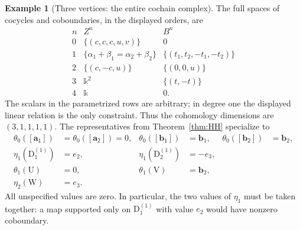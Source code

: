 \documentclass[a4paper,11pt,oneside,reqno]{amsart}
\theoremstyle{definition}
\newtheorem{example}[theorem]{Example}
\numberwithin{equation}{section}
\begin{document}
\begin{example}[Three vertices: the entire cochain complex]
		The full spaces of cocycles and coboundaries, in the displayed orders,
		are
		\begin{equation}\label{eq:m3-ZB}
			\begin{array}{c|c|c}
				n&Z^n&B^n\\\hline
				0&\{(c,c,c,u,v)\}&0\\
				1&\{\alpha_1+\beta_1=\alpha_2+\beta_2\}
				&\{(t_1,t_2,-t_1,-t_2)\}\\
				2&\{(c,-c,u)\}&\{(0,0,u)\}\\
				3&\Bbbk^2&\{(t,-t)\}\\
				4&\Bbbk&0.
			\end{array}
		\end{equation}
		The scalars in the parametrized rows are arbitrary; in degree one
		the displayed linear relation is the only constraint.
		Thus the cohomology dimensions are $(3,1,1,1,1)$.
		The representatives from Theorem~\ref{thm:HH} specialize to
		\begin{align*}
			\theta_0(\mathsf{[\mathbf{a}_1]})&=\theta_0(\mathsf{[\mathbf{a}_2]})=0,&
			\theta_0(\mathsf{[\mathbf{b}_1]})&=\mathbf{b}_1,&\theta_0(\mathsf{[\mathbf{b}_2]})&=\mathbf{b}_2,\\
			\eta_1(\mathrm{D}_1^{(1)})&=e_2,&
			\eta_1(\mathrm{D}_2^{(1)})&=-e_3,\\
			\theta_1(\mathrm{U})&=0,&\theta_1(\mathrm{V})&=\mathbf{b}_2,\\
			\eta_2(\mathrm{W})&=e_3.
		\end{align*}
		All unspecified values are zero.  In particular, the two values of
		$\eta_1$ must be taken together: a map supported only on $\mathrm{D}_1^{(1)}$
		with value $e_2$ would have nonzero coboundary.
	\end{example}
	
\end{document}
